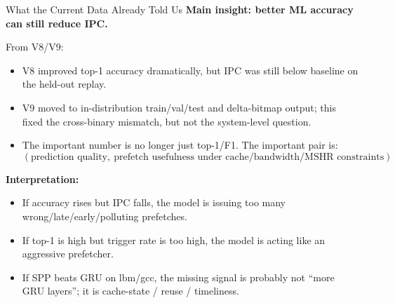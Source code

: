 \documentclass[10pt,aspectratio=169]{beamer}
\begin{document}
\begin{frame}{What the Current Data Already Told Us}
  \textbf{Main insight: better ML accuracy can still reduce IPC.}

  \vspace{0.3em}
  From V8/V9:
  \begin{itemize}
    \item V8 improved top-1 accuracy dramatically, but IPC was still below baseline on the held-out replay.
    \item V9 moved to in-distribution train/val/test and delta-bitmap output; this fixed the cross-binary mismatch, but not the system-level question.
    \item The important number is no longer just top-1/F1. The important pair is:
      \[
        (\text{prediction quality},\ \text{prefetch usefulness under cache/bandwidth/MSHR constraints})
      \]
  \end{itemize}

  \vspace{0.4em}
  \textbf{Interpretation:}
  \begin{itemize}
    \item If accuracy rises but IPC falls, the model is issuing too many wrong/late/early/polluting prefetches.
    \item If top-1 is high but trigger rate is too high, the model is acting like an aggressive prefetcher.
    \item If SPP beats GRU on lbm/gcc, the missing signal is probably not ``more GRU layers''; it is cache-state / reuse / timeliness.
  \end{itemize}
\end{frame}
\end{document}
